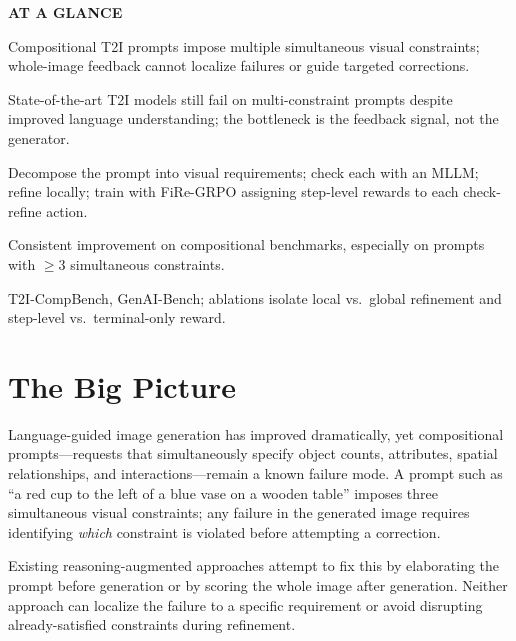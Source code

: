 \documentclass[10pt,twocolumn]{article}
\begin{document}
\begin{mdframed}[backgroundcolor=boxgray,linecolor=rulered,linewidth=1pt,
    innerleftmargin=6pt,innerrightmargin=6pt,
    innertopmargin=6pt,innerbottommargin=6pt]
\textbf{\small AT A GLANCE}\par\vspace{4pt}
\begin{description}[leftmargin=0pt,labelsep=4pt,itemsep=2pt,parsep=0pt,
    font=\small\bfseries]
  \item[Problem:] Compositional T2I prompts impose multiple simultaneous
    visual constraints; whole-image feedback cannot localize failures or
    guide targeted corrections.
  \item[Why it matters:] State-of-the-art T2I models still fail on multi-constraint
    prompts despite improved language understanding; the bottleneck is the
    feedback signal, not the generator.
  \item[Method:] Decompose the prompt into visual requirements; check each
    with an MLLM; refine locally; train with FiRe-GRPO assigning step-level
    rewards to each check-refine action.
  \item[Result:] Consistent improvement on compositional benchmarks,
    especially on prompts with $\geq 3$ simultaneous constraints.
  \item[Evidence:] T2I-CompBench, GenAI-Bench; ablations isolate local vs.\
    global refinement and step-level vs.\ terminal-only reward.
\end{description}
\end{mdframed}

\section{The Big Picture}

Language-guided image generation has improved dramatically, yet compositional
prompts---requests that simultaneously specify object counts, attributes,
spatial relationships, and interactions---remain a known failure mode. A
prompt such as ``a red cup to the left of a blue vase on a wooden table''
imposes three simultaneous visual constraints; any failure in the generated
image requires identifying \emph{which} constraint is violated before attempting
a correction.

Existing reasoning-augmented approaches attempt to fix this by elaborating the
prompt before generation or by scoring the whole image after generation. Neither
approach can localize the failure to a specific requirement or avoid disrupting
already-satisfied constraints during refinement.
\end{document}
